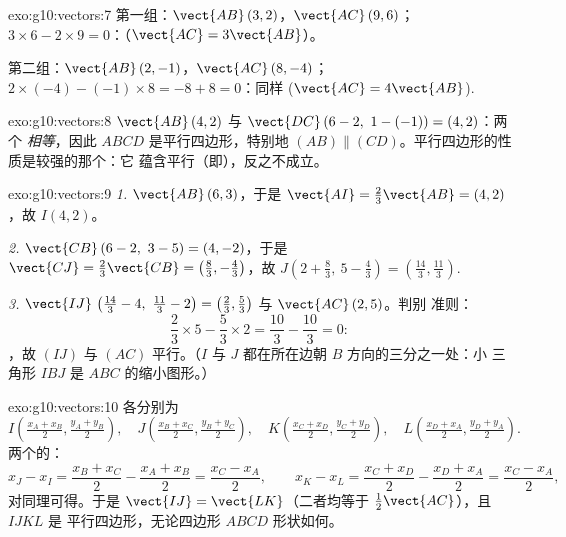 \begin{solution}{exo:g10:vectors:7}
第一组：$\vect{AB}\,(3, 2)$，$\vect{AC}\,(9, 6)$；
$3 \times 6 - 2 \times 9 = 0$：（$\vect{AC} = 3\vect{AB}$）。

第二组：$\vect{AB}\,(2, -1)$，$\vect{AC}\,(8, -4)$；
$2 \times (-4) - (-1) \times 8 = -8 + 8 = 0$：同样
($\vect{AC} = 4\vect{AB}$).
\end{solution}

\begin{solution}{exo:g10:vectors:8}
$\vect{AB}\,(4, 2)$ 与 $\vect{DC}\,(6-2,\ 1-(-1)) = (4, 2)$：两个
\emph{相等}，因此 $ABCD$ 是平行四边形，特别地
$(AB) \parallel (CD)$。平行四边形的性质是较强的那个：它
蕴含平行（即），反之不成立。
\end{solution}

\begin{solution}{exo:g10:vectors:9}
\emph{1.} $\vect{AB}\,(6, 3)$，于是
$\vect{AI} = \frac23\vect{AB} = (4, 2)$，故 $I(4, 2)$。

\emph{2.} $\vect{CB}\,(6-2,\ 3-5) = (4, -2)$，于是
$\vect{CJ} = \frac23\vect{CB} = \left(\frac83, -\frac43\right)$，故
$J\left(2 + \frac83,\ 5 - \frac43\right) = \left(\frac{14}{3},
\frac{11}{3}\right)$.

\emph{3.} $\vect{IJ}\,\left(\frac{14}{3} - 4,\ \frac{11}{3} - 2\right) =
\left(\frac23, \frac53\right)$ 与 $\vect{AC}\,(2, 5)$。判别
准则：
\[
\frac23 \times 5 - \frac53 \times 2 = \frac{10}{3} - \frac{10}{3} = 0 :
\]
，故 $(IJ)$ 与 $(AC)$ 平行。（$I$ 与
$J$ 都在所在边朝 $B$ 方向的三分之一处：小
三角形 $IBJ$ 是 $ABC$ 的缩小图形。）
\end{solution}

\begin{solution}{exo:g10:vectors:10}
各分别为
\[
I\left(\tfrac{x_A + x_B}{2}, \tfrac{y_A + y_B}{2}\right), \quad
J\left(\tfrac{x_B + x_C}{2}, \tfrac{y_B + y_C}{2}\right), \quad
K\left(\tfrac{x_C + x_D}{2}, \tfrac{y_C + y_D}{2}\right), \quad
L\left(\tfrac{x_D + x_A}{2}, \tfrac{y_D + y_A}{2}\right).
\]
两个的：
\[
x_J - x_I = \frac{x_B + x_C}{2} - \frac{x_A + x_B}{2}
= \frac{x_C - x_A}{2},
\qquad
x_K - x_L = \frac{x_C + x_D}{2} - \frac{x_D + x_A}{2}
= \frac{x_C - x_A}{2},
\]
对同理可得。于是
$\vect{IJ} = \vect{LK}$（二者均等于 $\frac12\vect{AC}$），且 $IJKL$ 是
平行四边形，无论四边形 $ABCD$ 形状如何。
\end{solution}

